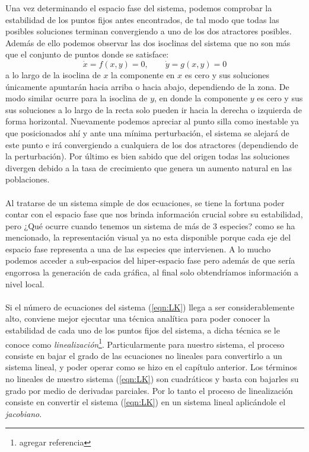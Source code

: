 \setlength{\parindent}{0cm}Una vez determinando el espacio fase del sistema, podemos comprobar la estabilidad de los puntos fijos antes encontrados, de tal modo que todas las posibles soluciones terminan convergiendo a uno de los dos atractores posibles. Además de ello podemos observar las dos isoclinas del sistema que no son más que el conjunto de puntos donde se satisface:
\begin{equation*}
	\dot{x}=f(x,y)=0,\qquad\dot{y}=g(x,y)=0
\end{equation*}
a lo largo de la isoclina de $x$ la componente en $x$ es cero y sus soluciones únicamente apuntarán hacia arriba o hacia abajo, dependiendo de la zona. De modo similar ocurre para la isoclina de $y$, en donde la componente $y$ es cero y sus sus soluciones a lo largo de la recta solo pueden ir hacia la derecha o izquierda de forma horizontal. Nuevamente podemos apreciar al punto silla como inestable ya que posicionados ahí y ante una mínima perturbación, el sistema se alejará de este punto e irá convergiendo a cualquiera de los dos atractores (dependiendo de la perturbación). Por último es bien sabido que del origen todas las soluciones divergen debido a la tasa de crecimiento que genera un aumento natural en las poblaciones.\\
\\
Al tratarse de un sistema simple de dos ecuaciones, se tiene la fortuna poder contar con el espacio fase que nos brinda información crucial sobre su estabilidad, pero ¿Qué ocurre cuando tenemos un sistema de más de 3 especies? como se ha mencionado, la representación visual ya no esta disponible porque cada eje del espacio fase representa a una de las especies que intervienen. A lo mucho podemos acceder a sub-espacios del hiper-espacio fase pero además de que sería engorrosa la generación de cada gráfica, al final solo obtendríamos información a nivel local. 
\\
\\
Si el número de ecuaciones del sistema (\ref{eqn:LK}) llega a ser considerablemente alto, conviene mejor ejecutar una técnica analítica para poder conocer la estabilidad de cada uno de los puntos fijos del sistema, a dicha técnica se le conoce como \textit{linealización}\footnote{agregar referencia}. Particularmente para nuestro sistema, el proceso consiste en bajar el grado de las ecuaciones no lineales para convertirlo a un sistema lineal, y poder operar como se hizo en el capítulo anterior. Los términos no lineales de nuestro sistema (\ref{eqn:LK}) son cuadráticos y basta con bajarles su grado por medio de derivadas parciales. Por lo tanto el proceso de linealización consiste en convertir el sistema (\ref{eqn:LK}) en un sistema lineal aplicándole el \textit{jacobiano}.
